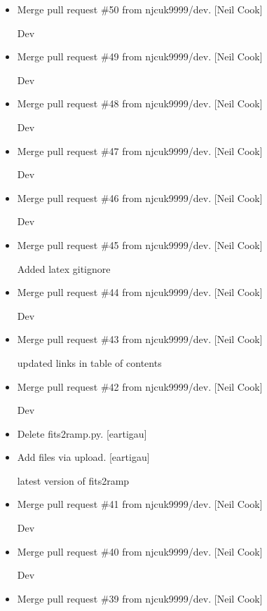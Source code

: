 \documentclass[a4paper,10pt,english]{report}
\begin{document}
\begin{itemize}
\item {} 
Merge pull request \#50 from njcuk9999/dev. {[}Neil Cook{]}

Dev

\item {} 
Merge pull request \#49 from njcuk9999/dev. {[}Neil Cook{]}

Dev

\item {} 
Merge pull request \#48 from njcuk9999/dev. {[}Neil Cook{]}

Dev

\item {} 
Merge pull request \#47 from njcuk9999/dev. {[}Neil Cook{]}

Dev

\item {} 
Merge pull request \#46 from njcuk9999/dev. {[}Neil Cook{]}

Dev

\item {} 
Merge pull request \#45 from njcuk9999/dev. {[}Neil Cook{]}

Added latex gitignore

\item {} 
Merge pull request \#44 from njcuk9999/dev. {[}Neil Cook{]}

Dev

\item {} 
Merge pull request \#43 from njcuk9999/dev. {[}Neil Cook{]}

updated links in table of contents

\item {} 
Merge pull request \#42 from njcuk9999/dev. {[}Neil Cook{]}

Dev

\item {} 
Delete fits2ramp.py. {[}eartigau{]}

\item {} 
Add files via upload. {[}eartigau{]}

latest version of fits2ramp

\item {} 
Merge pull request \#41 from njcuk9999/dev. {[}Neil Cook{]}

Dev

\item {} 
Merge pull request \#40 from njcuk9999/dev. {[}Neil Cook{]}

Dev

\item {} 
Merge pull request \#39 from njcuk9999/dev. {[}Neil Cook{]}


\end{itemize}
\end{document}

